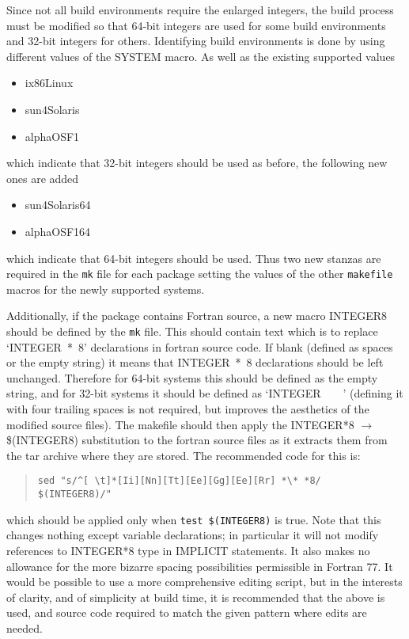 \documentclass[twoside,11pt]{article}
\newcommand{\latexhtml}[2]{#1}
\renewcommand{\_}{\texttt{\symbol{95}}}
\newcommand{\file}[1]{{\tt #1}}
\newenvironment{squote}{\begin{quote}\begin{small}}{\end{small}\end{quote}}
\begin{document}
Since not all build environments require the enlarged integers,
the build process must be modified so that 64-bit integers are
used for some build environments and 32-bit integers for others.
Identifying build environments is done by using different values
of the SYSTEM macro.  As well as the existing supported values
\begin{itemize}
\item ix86\_Linux
\item sun4\_Solaris
\item alpha\_OSF1
\end{itemize}
which indicate that 32-bit integers should be used as before, 
the following new ones are added
\begin{itemize}
\item sun4\_Solaris\_64
\item alpha\_OSF1\_64
\end{itemize}
which indicate that 64-bit integers should be used.
Thus two new stanzas are required in the \file{mk} file for each package
setting the values of the other \file{makefile} macros for the newly
supported systems.  

Additionally, if the package contains Fortran source,
a new macro INTEGER8 should be 
defined by the \file{mk} file.  This should contain text which is to
replace `INTEGER~*~8' declarations in fortran source code.  
If blank (defined as spaces or the empty string) it means 
that INTEGER~*~8 declarations should be left unchanged.
Therefore for 64-bit systems this should be defined as the empty
string, and for 32-bit systems it should be defined as `INTEGER~~~~'
(defining it with four trailing spaces
is not required, but improves the aesthetics of
the modified source files).
The makefile should then apply the 
INTEGER*8 \latexhtml{$\rightarrow$}{->} \$(INTEGER8)
substitution to the fortran source files as it extracts them from the
tar archive where they are stored.
The recommended code for this is:
\begin{squote}
\begin{verbatim}
sed "s/^[ \t]*[Ii][Nn][Tt][Ee][Gg][Ee][Rr] *\* *8/      $(INTEGER8)/"
\end{verbatim}
\end{squote}
which should be applied only when {\tt test \$(INTEGER8)} is true.
Note that this changes nothing except variable declarations; 
in particular it will not modify references to INTEGER*8 type in IMPLICIT
statements.
It also makes no allowance for the more bizarre spacing possibilities
permissible in Fortran 77.
It would be possible to use a more comprehensive editing script,
but in the interests of clarity, and of simplicity at build time,
it is recommended that the above is used, 
and source code required to match the given pattern where edits
are needed.
\end{document}
